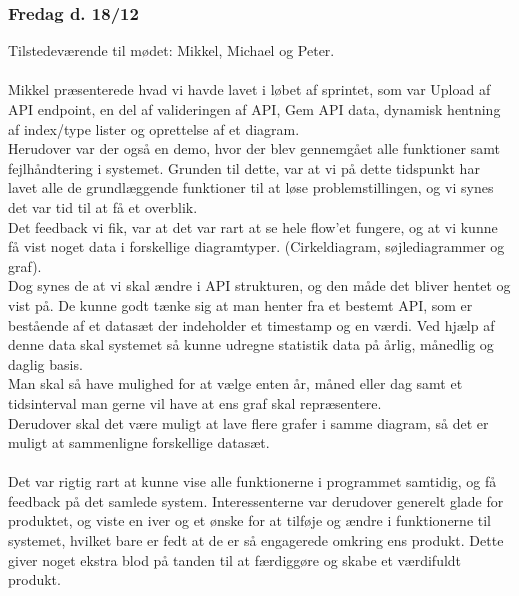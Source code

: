 \subsubsection{Fredag d. 18/12}
Tilstedeværende til mødet: Mikkel, Michael og Peter.
\\\\
Mikkel præsenterede hvad vi havde lavet i løbet af sprintet, som var Upload af API endpoint, en del af valideringen af API, Gem API data, dynamisk hentning af index/type lister og oprettelse af et diagram.\\
Herudover var der også en demo, hvor der blev gennemgået alle funktioner samt fejlhåndtering i systemet. Grunden til dette, var at vi på dette tidspunkt har lavet alle de grundlæggende funktioner til at løse
problemstillingen, og vi synes det var tid til at få et overblik.\\
Det feedback vi fik, var at det var rart at se hele flow'et fungere, og at vi kunne få vist noget data i forskellige diagramtyper. (Cirkeldiagram, søjlediagrammer og graf).\\
Dog synes de at vi skal ændre i API strukturen, og den måde det bliver hentet og vist på.
De kunne godt tænke sig at man henter fra et bestemt API, som er bestående af et datasæt der indeholder et timestamp og en værdi. Ved hjælp af denne data skal systemet så kunne
udregne statistik data på årlig, månedlig og daglig basis.\\
Man skal så have mulighed for at vælge enten år, måned eller dag samt et tidsinterval man gerne vil have at ens graf skal repræsentere.\\
Derudover skal det være muligt at lave flere grafer i samme diagram, så det er muligt at sammenligne forskellige datasæt.\\\\
Det var rigtig rart at kunne vise alle funktionerne i programmet samtidig, og få feedback på det samlede system. Interessenterne var derudover generelt glade for produktet, og viste en iver og et
ønske for at tilføje og ændre i funktionerne til systemet, hvilket bare er fedt at de er så engagerede omkring ens produkt. Dette giver noget ekstra blod på tanden til at færdiggøre og skabe et værdifuldt
produkt.
